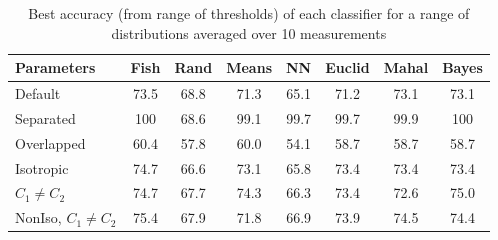 \documentclass[a4paper,11pt, twocolumn]{article}
\begin{document}
\begin{table}[b]
	\begin{tabular}{l*{7}{c}}
		Parameters & Fish & Rand & Means & NN & Euclid & Mahal & Bayes \\
		\hline
		Default & 73.5 & 68.8 & 71.3 & 65.1 & 71.2 & 73.1 & 73.1 \\
		Separated & 100 & 68.6 & 99.1 & 99.7 & 99.7 & 99.9 & 100 \\
		Overlapped & 60.4 & 57.8 & 60.0 & 54.1 & 58.7 & 58.7 & 58.7 \\
		Isotropic & 74.7 & 66.6 & 73.1 & 65.8 & 73.4 & 73.4 & 73.4 \\
		$C_1 \neq C_2$ & 74.7 & 67.7 & 74.3 & 66.3 & 73.4 & 72.6 & 75.0 \\
		NonIso, $C_1 \neq C_2$ & 75.4 & 67.9 & 71.8 & 66.9 & 73.9 & 74.5 & 74.4 \\
	\end{tabular}
	\caption{Best accuracy (from range of thresholds) of each classifier for a range of distributions averaged over 10 measurements}
	\label{table:AccuracyResults}
\end{table}
\end{document}
